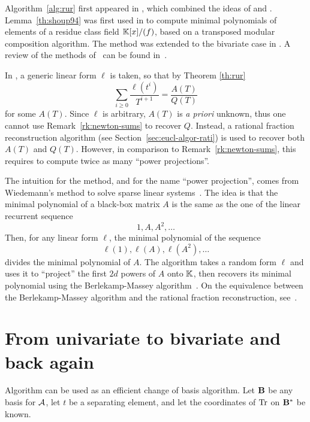 \begin{remark}
  \label{rk:shoups-algorithm-1}
  Algorithm~\ref{alg:rur} first appeared in
  \cite{bostan+salvy+schost03}, which combined the ideas of
  \cite{rouiller99} and
  \cite{shoup94,shoup95,shoup99}. Lemma~\ref{th:shoup94} was first
  used in \cite{shoup94} to compute minimal polynomials of elements of
  a residue class field $\mathbb{K}[x]/(f)$, based on a transposed modular
  composition algorithm. The method was extended to the bivariate case
  in \cite{shoup99}. A review of the methods
  of~\cite{shoup94,shoup95,shoup99} can be found
  in~\cite[$\S$6]{Ka2K}.
  
  In \cite{shoup94,shoup99}, a generic linear form $\ell$ is taken, so
  that by Theorem \ref{th:rur}
  \[\sum_{i\ge0}\frac{\ell(t^i)}{T^{i+1}}=\frac{A(T)}{Q(T)}\]
  for some $A(T)$. Since $\ell$ is arbitrary, $A(T)$ is \emph{a
    priori} unknown, thus one cannot use Remark~\ref{rk:newton-sums}
  to recover $Q$. Instead, a rational fraction reconstruction
  algorithm (see Section~\ref{sec:eucl-algor-rati}) is used to recover
  both $A(T)$ and $Q(T)$. However, in comparison to
  Remark~\ref{rk:newton-sums}, this requires to compute twice as many
  ``power projections''.
  
  The intuition for the method, and for the name ``power projection'',
  comes from Wiedemann's method to solve sparse linear
  systems~\cite{wiedemann:sparse}. The idea is that the minimal
  polynomial of a black-box matrix $A$ is the same as the one of the
  linear recurrent sequence
  \[1,A,A^2,\ldots\] 
  Then, for any linear form $\ell$, the minimal polynomial of the sequence
  \[\ell(1),\ell(A),\ell(A^2),\ldots\]
  divides the minimal polynomial of $A$. The algorithm takes a random
  form $\ell$ and uses it to ``project'' the first $2d$ powers of $A$
  onto $\mathbb{K}$, then recovers its minimal polynomial using the
  Berlekamp-Massey algorithm~\cite{massey69}. On the equivalence
  between the Berlekamp-Massey algorithm and the rational fraction
  reconstruction, see~\cite{dornstetter87}.
\end{remark}


\section{From univariate to bivariate and back again}
\label{sec:from-univ-bivar}

Algorithm \hyperref[alg:rur]{} can be used as an efficient change of basis
algorithm. Let $\mathbf{B}$ be any basis for $\mathcal{A}$, let $t$ be a
separating element, and let the coordinates of $\operatorname{Tr}$ on
$\mathbf{B}^\ast$ be known.

